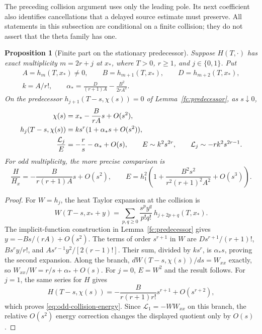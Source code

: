 \documentclass[11pt]{article}
\numberwithin{equation}{section}
\newtheorem{proposition}[theorem]{Proposition}
\theoremstyle{definition}
\theoremstyle{remark}
\newcommand{\Lag}{\mathcal L}
\begin{document}
The preceding collision argument uses only the leading pole.  Its next
coefficient also identifies cancellations that a delayed source estimate
must preserve.  All statements in this subsection are conditional on a
finite collision; they do not assert that the theta family has one.

\begin{proposition}[Finite part on the stationary predecessor]
\label{prop:collision-finite-part}
Suppose $H(T,\cdot)$ has exact multiplicity $m=2r+j$ at $x_*$, where
$T>0$, $r\ge1$, and $j\in\{0,1\}$. Put
\[
 \begin{gathered}
 A=h_m(T,x_*)\ne0,\qquad B=h_{m+1}(T,x_*),\qquad
 D=h_{m+2}(T,x_*),\\
 k=A/r!,\qquad \alpha_* =\frac{D}{(r+1)A}-\frac{B^2}{2rA^2}.
 \end{gathered}
\]
On the predecessor $h_{j+1}(T-s,\chi(s))=0$ of
Lemma~\ref{fc:predecessor}, as $s\downarrow0$,
\begin{align}
 \chi(s)&=x_*-\frac{B}{rA}s+O(s^2),\notag\\
 h_j(T-s,\chi(s))&=k s^r(1+\alpha_*s+O(s^2)),\notag\\
 \frac{\Lag_j}{E}&=-\frac rs-\alpha_*+O(s),
 \qquad E\sim k^2s^{2r},\qquad
 \Lag_j\sim-rk^2s^{2r-1}.
 \label{eq:collision-finite-part}
\end{align}
For odd multiplicity, the more precise comparison is
\begin{equation}
 \frac{H}{H_x}=-\frac{B}{r(r+1)A}s+O(s^2),\qquad
 E=h_1^2\left(1+\frac{B^2s^2}{r^2(r+1)^2A^2}+O(s^3)\right).
 \label{eq:odd-collision-energy}
\end{equation}
\end{proposition}
\begin{proof}
For $W=h_j$, the heat Taylor expansion at the collision is
\[
 W(T-s,x_*+y)=\sum_{p,q\ge0}
 \frac{s^py^q}{p!q!}\,h_{j+2p+q}(T,x_*).
\]
The implicit-function construction in Lemma~\ref{fc:predecessor}
gives $y=-Bs/(rA)+O(s^2)$.  The terms of order $s^{r+1}$ in $W$
are $Ds^{r+1}/(r+1)!$, $Bs^ry/r!$, and
$As^{r-1}y^2/[2(r-1)!]$.  Their sum, divided by $ks^r$,
is $\alpha_*s$, proving the second expansion.  Along the branch,
$dW(T-s,\chi(s))/ds=W_{xx}$ exactly, so
$W_{xx}/W=r/s+\alpha_*+O(s)$.  For $j=0$, $E=W^2$ and the result
follows.  For $j=1$, the same series for $H$ gives
\[
 H(T-s,\chi(s))=-\frac{B}{r(r+1)r!}s^{r+1}+O(s^{r+2}),
\]
which proves \eqref{eq:odd-collision-energy}.  Since
$\Lag_1=-W W_{xx}$ on this branch, the relative $O(s^2)$ energy
correction changes the displayed quotient only by $O(s)$.
\end{proof}
\end{document}
